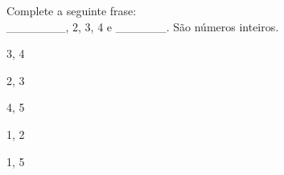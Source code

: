 \question[10]
Complete a seguinte frase:\\
_______, 2, 3, 4 e ______. São números inteiros.
\\
\begin{choices}
\item 3, 4 
\item 2, 3
\item 4, 5 
\item 1, 2 
\item 1, 5 %
\end{choices}
\answerline

